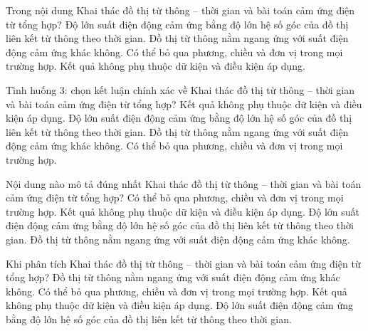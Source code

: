 \begin{ex}
Trong nội dung Khai thác đồ thị từ thông – thời gian và bài toán cảm ứng điện từ tổng hợp?
\choice
{\True Độ lớn suất điện động cảm ứng bằng độ lớn hệ số góc của đồ thị liên kết từ thông theo thời gian.}
{Đồ thị từ thông nằm ngang ứng với suất điện động cảm ứng khác không.}
{Có thể bỏ qua phương, chiều và đơn vị trong mọi trường hợp.}
{Kết quả không phụ thuộc dữ kiện và điều kiện áp dụng.}
\end{ex}

\begin{ex}
Tình huống 3: chọn kết luận chính xác về Khai thác đồ thị từ thông – thời gian và bài toán cảm ứng điện từ tổng hợp?
\choice
{Kết quả không phụ thuộc dữ kiện và điều kiện áp dụng.}
{\True Độ lớn suất điện động cảm ứng bằng độ lớn hệ số góc của đồ thị liên kết từ thông theo thời gian.}
{Đồ thị từ thông nằm ngang ứng với suất điện động cảm ứng khác không.}
{Có thể bỏ qua phương, chiều và đơn vị trong mọi trường hợp.}
\end{ex}

\begin{ex}
Nội dung nào mô tả đúng nhất Khai thác đồ thị từ thông – thời gian và bài toán cảm ứng điện từ tổng hợp?
\choice
{Có thể bỏ qua phương, chiều và đơn vị trong mọi trường hợp.}
{Kết quả không phụ thuộc dữ kiện và điều kiện áp dụng.}
{\True Độ lớn suất điện động cảm ứng bằng độ lớn hệ số góc của đồ thị liên kết từ thông theo thời gian.}
{Đồ thị từ thông nằm ngang ứng với suất điện động cảm ứng khác không.}
\end{ex}

\begin{ex}
Khi phân tích Khai thác đồ thị từ thông – thời gian và bài toán cảm ứng điện từ tổng hợp?
\choice
{Đồ thị từ thông nằm ngang ứng với suất điện động cảm ứng khác không.}
{Có thể bỏ qua phương, chiều và đơn vị trong mọi trường hợp.}
{Kết quả không phụ thuộc dữ kiện và điều kiện áp dụng.}
{\True Độ lớn suất điện động cảm ứng bằng độ lớn hệ số góc của đồ thị liên kết từ thông theo thời gian.}
\end{ex}

